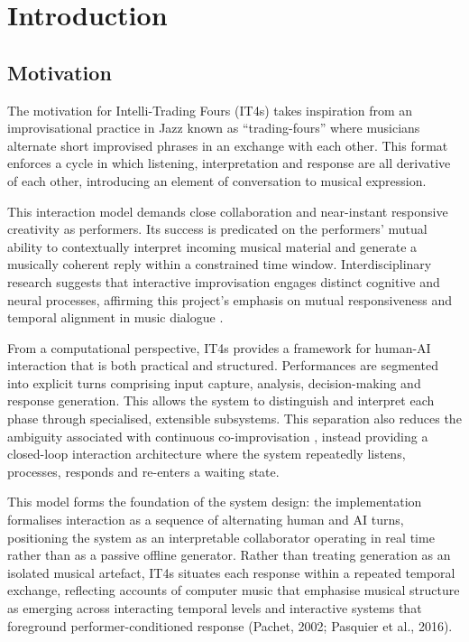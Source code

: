 \chapter{Introduction}\label{introduction}

\section{Motivation}\label{motivation}

The motivation for Intelli-Trading Fours (IT4s) takes inspiration from
an improvisational practice in Jazz known as ``trading-fours'' where
musicians alternate short improvised phrases in an exchange with each
other. This format enforces a cycle in which listening, interpretation
and response are all derivative of each other, introducing an element of
conversation to musical expression.

This interaction model demands close collaboration and near-instant
responsive creativity as performers. Its success is predicated on the
performers' mutual ability to contextually interpret incoming musical
material and generate a musically coherent reply within a constrained
time window. Interdisciplinary research suggests that interactive
improvisation engages distinct cognitive and neural processes, affirming
this project's emphasis on mutual responsiveness and temporal alignment
in music dialogue \citep{donnay2014neural}.

From a computational perspective, IT4s provides a framework for human-AI
interaction that is both practical and structured. Performances are
segmented into explicit turns comprising input capture, analysis,
decision-making and response generation. This allows the system to
distinguish and interpret each phase through specialised, extensible
subsystems. This separation also reduces the ambiguity associated with
continuous co-improvisation \citep{assayag2006skini}, instead
providing a closed-loop interaction architecture where the system
repeatedly listens, processes, responds and re-enters a waiting state.

This model forms the foundation of the system design: the implementation
formalises interaction as a sequence of alternating human and AI turns,
positioning the system as an interpretable collaborator operating in
real time rather than as a passive offline generator. Rather than
treating generation as an isolated musical artefact, IT4s situates each
response within a repeated temporal exchange, reflecting accounts of
computer music that emphasise musical structure as emerging across
interacting temporal levels \citep{vaggione1993determinism} and interactive systems
that foreground performer-conditioned response (Pachet, 2002; Pasquier
et al., 2016).


